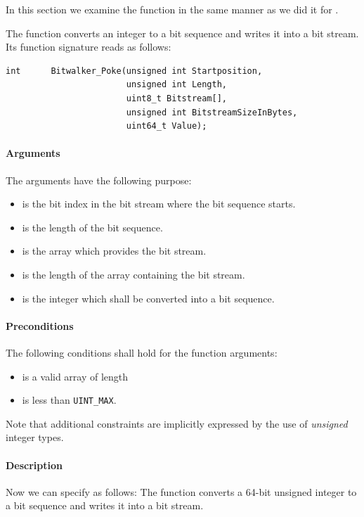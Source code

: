 In this section we examine the function \poke
in the same manner as we did it for \peek.

The function \poke converts an integer to a bit sequence and writes it
into a bit stream.
Its function signature reads as follows:
\begin{lstlisting}[style = acsl-block]
int      Bitwalker_Poke(unsigned int Startposition,
                        unsigned int Length,
                        uint8_t Bitstream[],
                        unsigned int BitstreamSizeInBytes,
                        uint64_t Value);
\end{lstlisting}


\paragraph{Arguments}
The arguments have the following purpose:

\begin{itemize}
    \item {} is the bit index in the bit stream 
    where the bit sequence starts.
    \item {} is the length of the bit sequence.
    \item {} is the array which provides the bit stream.
    \item {} is the length of the array 
    containing the bit stream. 
    \item {} is the integer which shall be converted into a bit sequence.
\end{itemize}


\paragraph{Preconditions}
The following conditions shall hold for the function arguments:

\begin{itemize}
\item {} is a valid array of length 

\item {} is less than \verb"UINT_MAX".
\end{itemize}

Note that additional constraints are implicitly expressed by the use
of \emph{unsigned} integer types.


\paragraph{Description}
Now we can specify \poke as follows:
The function \poke converts a 64-bit unsigned integer to a bit sequence and 
writes it into a bit stream.

